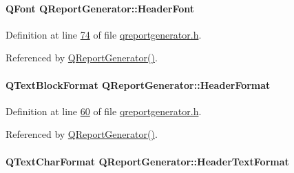 \paragraph[{Header\+Font}]{\setlength{\rightskip}{0pt plus 5cm}Q\+Font Q\+Report\+Generator\+::\+Header\+Font\hspace{0.3cm}{\ttfamily [private]}}\label{class_q_report_generator_ad23921b0c8d0e77db7cfc0b611d9e93c}


Definition at line \hyperlink{qreportgenerator_8h_source_l00074}{74} of file \hyperlink{qreportgenerator_8h_source}{qreportgenerator.\+h}.



Referenced by \hyperlink{qreportgenerator_8cpp_source_l00004}{Q\+Report\+Generator()}.

\hypertarget{class_q_report_generator_af2b45261507663b54e80f4053d25bc4b}{}
\paragraph[{Header\+Format}]{\setlength{\rightskip}{0pt plus 5cm}Q\+Text\+Block\+Format Q\+Report\+Generator\+::\+Header\+Format\hspace{0.3cm}{\ttfamily [private]}}\label{class_q_report_generator_af2b45261507663b54e80f4053d25bc4b}


Definition at line \hyperlink{qreportgenerator_8h_source_l00060}{60} of file \hyperlink{qreportgenerator_8h_source}{qreportgenerator.\+h}.



Referenced by \hyperlink{qreportgenerator_8cpp_source_l00004}{Q\+Report\+Generator()}.

\hypertarget{class_q_report_generator_a8be687c8a427e341fa1c7f9addc96e99}{}
\paragraph[{Header\+Text\+Format}]{\setlength{\rightskip}{0pt plus 5cm}Q\+Text\+Char\+Format Q\+Report\+Generator\+::\+Header\+Text\+Format\hspace{0.3cm}{\ttfamily [private]}}\label{class_q_report_generator_a8be687c8a427e341fa1c7f9addc96e99}


